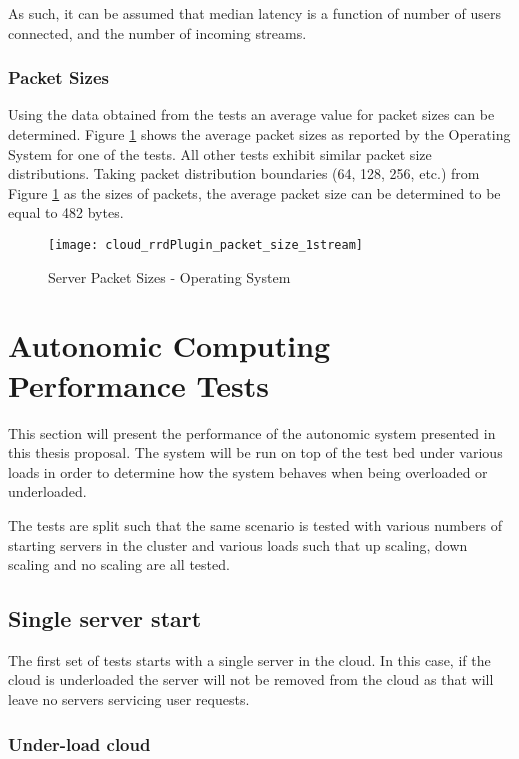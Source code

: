 As such, it can be assumed that median latency is a function of number of users connected, and the number of incoming streams.

\subsubsection{Packet Sizes}

Using the data obtained from the tests an average value for packet sizes can be determined. Figure \ref{fig:1serv1streampacketsizes} shows the average packet sizes as reported by the Operating System for one of the tests. All other tests exhibit similar packet size distributions. Taking packet distribution boundaries (64, 128, 256, etc.) from Figure \ref{fig:1serv1streampacketsizes} as the sizes of packets, the average packet size can be determined to be equal to 482 bytes.

\begin{figure}
	\centering
		\texttt{[image: cloud\_rrdPlugin\_packet\_size\_1stream]}
	\caption{Server Packet Sizes - Operating System}
	\label{fig:1serv1streampacketsizes}
\end{figure}

\section{Autonomic Computing Performance Tests}

This section will present the performance of the autonomic system presented in this thesis proposal. The system will be run on top of the test bed under various loads in order to determine how the system behaves when being overloaded or underloaded.

The tests are split such that the same scenario is tested with various numbers of starting servers in the cluster and various loads such that up scaling, down scaling and no scaling are all tested.

\subsection{Single server start}

The first set of tests starts with a single server in the cloud. In this case, if the cloud is underloaded the server will not be removed from the cloud as that will leave no servers servicing user requests.

\subsubsection{Under-load cloud}


